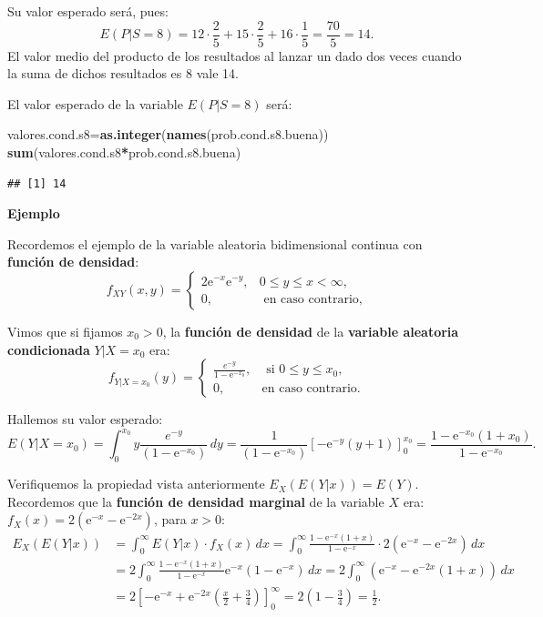 \documentclass[]{book}
\newenvironment{Shaded}{\begin{snugshade}}{\end{snugshade}}
\newcommand{\KeywordTok}[1]{\textcolor[rgb]{0.13,0.29,0.53}{\textbf{#1}}}
\newcommand{\NormalTok}[1]{#1}
\newcommand{\OperatorTok}[1]{\textcolor[rgb]{0.81,0.36,0.00}{\textbf{#1}}}
\begin{document}
Su valor esperado será, pues:
\[
E(P|S=8)=12\cdot \frac{2}{5}+15\cdot \frac{2}{5}+16\cdot \frac{1}{5}=\frac{70}{5}=14.
\]
El valor medio del producto de los resultados al lanzar un dado dos veces cuando la suma de dichos resultados es 8 vale 14.

El valor esperado de la variable \(E(P|S=8)\) será:

\begin{Shaded}
\begin{Highlighting}[]
\NormalTok{valores.cond.s8=}\KeywordTok{as.integer}\NormalTok{(}\KeywordTok{names}\NormalTok{(prob.cond.s8.buena))}
\KeywordTok{sum}\NormalTok{(valores.cond.s8}\OperatorTok{*}\NormalTok{prob.cond.s8.buena)}
\end{Highlighting}
\end{Shaded}

\begin{verbatim}
## [1] 14
\end{verbatim}

\textbf{Ejemplo}

Recordemos el ejemplo de la variable aleatoria bidimensional continua con \textbf{función de densidad}:
\[
f_{XY}(x,y)=\begin{cases}
2 \mathrm{e}^{-x}\mathrm{e}^{-y}, & 0\leq y\leq x < \infty,\\
0, & \mbox{ en caso contrario,}
\end{cases}
\]

Vimos que si fijamos \(x_0>0\), la \textbf{función de densidad} de la \textbf{variable aleatoria condicionada} \(Y|X=x_0\) era:
\[
f_{Y|X=x_0}(y)=\begin{cases}
\frac{e^{-y}}{1-\mathrm{e}^{-x_0}}, & \mbox{ si }0\leq y\leq x_0, \\
0, & \mbox{en caso contrario.}
\end{cases}
\]

Hallemos su valor esperado:
\[
E(Y|X=x_0)=\int_0^{x_0} y \frac{e^{-y}}{(1-\mathrm{e}^{-x_0})}\, dy=\frac{1}{(1-\mathrm{e}^{-x_0})}\left[-\mathrm{e}^{-y} (y+1)\right]_0^{x_0} = \frac{1-\mathrm{e}^{-x_0}(1+x_0)}{1-\mathrm{e}^{-x_0}}.
\]

Verifiquemos la propiedad vista anteriormente \(E_X(E(Y|x))=E(Y)\). Recordemos que la \textbf{función de densidad marginal} de la variable \(X\) era: \(f_X(x)=2\left(\mathrm{e}^{-x}-\mathrm{e}^{-2x}\right)\), para \(x>0\):
\[
\begin{array}{rl}
E_X(E(Y|x)) & =\int_0^\infty E(Y|x)\cdot f_X(x)\, dx = \int_0^\infty \frac{1-\mathrm{e}^{-x}(1+x)}{1-\mathrm{e}^{-x}}\cdot 2\left(\mathrm{e}^{-x}-\mathrm{e}^{-2x}\right)\, dx 
\\ & =  2\int_0^\infty \frac{1-\mathrm{e}^{-x}(1+x)}{1-\mathrm{e}^{-x}} \mathrm{e}^{-x}\left(1-\mathrm{e}^{-x}\right)\, dx = 2 \int_0^\infty \left(\mathrm{e}^{-x}-\mathrm{e}^{-2x}(1+x)\right)\, dx \\ & = 2\left[-\mathrm{e}^{-x}+\mathrm{e}^{-2 x}
   \left(\frac{x}{2}+\frac{3}{4}\right)\right]_0^\infty = 2 \left(1-\frac{3}{4}\right)=\frac{1}{2}.
\end{array}
\]
\end{document}
